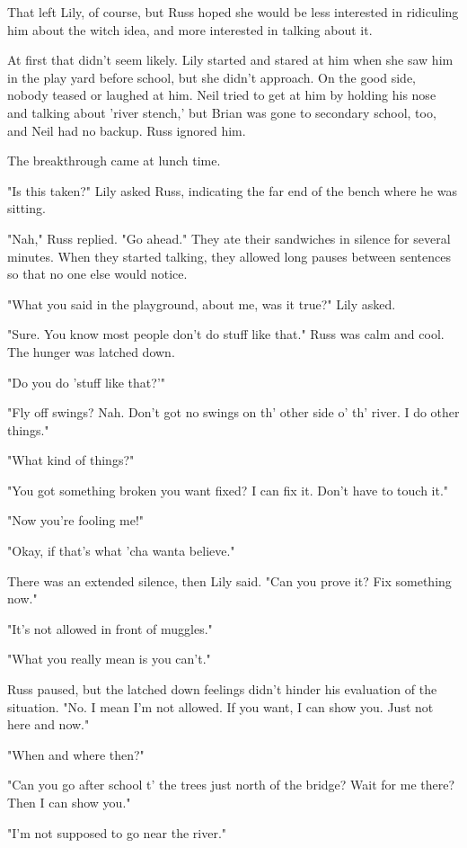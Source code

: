 \documentclass[a4paper,11pt]{article}
\begin{document}
That left Lily, of course, but Russ hoped she would be less interested in ridiculing him about the witch idea, and more interested in talking about it.

At first that didn't seem likely. Lily started and stared at him when she saw him in the play yard before school, but she didn't approach. On the good side, nobody teased or laughed at him. Neil tried to get at him by holding his nose and talking about 'river stench,' but Brian was gone to secondary school, too, and Neil had no backup. Russ ignored him.

The breakthrough came at lunch time.

"Is this taken?" Lily asked Russ, indicating the far end of the bench where he was sitting.

"Nah," Russ replied. "Go ahead." They ate their sandwiches in silence for several minutes. When they started talking, they allowed long pauses between sentences so that no one else would notice.

"What you said in the playground, about me, was it true?" Lily asked.

"Sure. You know most people don't do stuff like that." Russ was calm and cool. The hunger was latched down.

"Do you do 'stuff like that?'"

"Fly off swings? Nah. Don't got no swings on th' other side o' th' river. I do other things."

"What kind of things?"

"You got something broken you want fixed? I can fix it. Don't have to touch it."

"Now you're fooling me!"

"Okay, if that's what 'cha wanta believe."

There was an extended silence, then Lily said. "Can you prove it? Fix something now."

"It's not allowed in front of muggles."

"What you really mean is you can't."

Russ paused, but the latched down feelings didn't hinder his evaluation of the situation. "No. I mean I'm not allowed. If you want, I can show you. Just not here and now."

"When and where then?"

"Can you go after school t' the trees just north of the bridge? Wait for me there? Then I can show you."

"I'm not supposed to go near the river."
\end{document}
